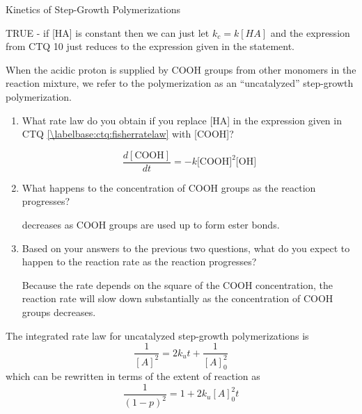 \begin{activity}{Kinetics of Step-Growth Polymerizations}
\begin{ctqs}
\begin{enumerate}
				\begin{solution}[2in]
				
				TRUE - if [HA] is constant then we can just let $k_c = k[HA]$ and the expression from CTQ 10 just reduces to the expression given in the statement.
				
				\end{solution}
				
		\end{enumerate}
		
	\question When the acidic proton is supplied by COOH groups from other monomers in the reaction mixture, we refer to the polymerization as an ``uncatalyzed'' step-growth polymerization.
	
		\begin{enumerate}
				
			\item  What rate law do you obtain if you replace [HA] in the expression given in CTQ \ref{\labelbase:ctq:fisherratelaw} with [COOH]?
			
				\begin{solution}[0.5in]	
					\begin{equation*}
						\frac{d[\text{COOH}]}{dt} = - k \text{[COOH]}^2\text{[OH]}
					\end{equation*}
				\end{solution}
		
			\item What happens to the concentration of COOH groups as the reaction progresses?
			
				\begin{solution}[0.5in]	
					[COOH] decreases as COOH groups are used up to form ester bonds.
				\end{solution}
			
			\item Based on your answers to the previous two questions, what do you expect to happen to the reaction rate as the reaction progresses?
			
				\begin{solution}[0.5in]	
					Because the rate depends on the square of the COOH concentration, the reaction rate will slow down substantially as the concentration of COOH groups decreases.
				\end{solution}
			
		\end{enumerate}
	
\end{ctqs}

\begin{infobox}\label{\labelbase:info:uncatintrate}
	The integrated rate law for uncatalyzed step-growth polymerizations is
	\begin{equation*}
		\frac{1}{[A]^2} = 2k_u t + \frac{1}{[A]_0^2}
	\end{equation*}
	which can be rewritten in terms of the extent of reaction as
	\begin{equation*}
		\frac{1}{(1-p)^2} = 1 + 2k_u [A]_0^2 t
	\end{equation*}
\end{infobox}


\end{activity}
